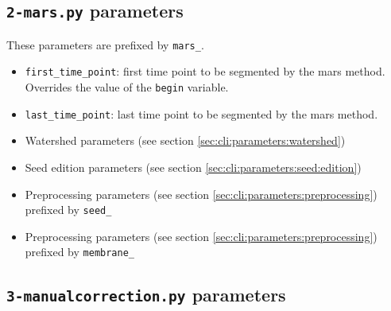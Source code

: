 \subsection{\texttt{2-mars.py} parameters}
\label{sec:cli:parameters:mars}

These parameters are prefixed by \texttt{mars\_}.
 
\begin{itemize}
\itemsep -0.5ex
\item \texttt{first\_time\_point}:
  first time point to be segmented by the mars method.
  Overrides the value of the \texttt{begin} variable.
\item \texttt{last\_time\_point}:
  last time point to be segmented by the mars method.
\item Watershed parameters 
  (see section \ref{sec:cli:parameters:watershed})
\item Seed edition parameters
  (see section \ref{sec:cli:parameters:seed:edition})
\item Preprocessing parameters
  (see section \ref{sec:cli:parameters:preprocessing})
  prefixed by \texttt{seed\_}
\item Preprocessing parameters
  (see section \ref{sec:cli:parameters:preprocessing})
  prefixed by \texttt{membrane\_}
\end{itemize}










\subsection{\texttt{3-manualcorrection.py} parameters}
\label{sec:cli:parameters:manualcorrection}

